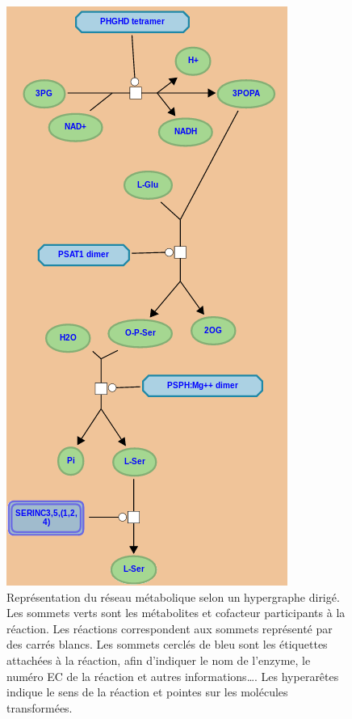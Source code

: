 \begin{refsegment}
\begin{shadedfigure}
\begin{subfigure}[t]{.45\textwidth}
        \includegraphics[width=\textwidth]{img/reactome_homo_sapiens_serine_biosynthesis.png}
        \caption{ Représentation du réseau métabolique selon un hypergraphe dirigé. Les sommets verts sont les métabolites et cofacteur participants à la réaction. Les réactions correspondent aux sommets représenté par des carrés blancs. Les sommets cerclés de bleu sont les étiquettes attachées à la réaction, afin d'indiquer le nom de l'enzyme, le numéro \gls{EC} de la réaction et autres informations\ldots. Les hyperarêtes indique le sens de la réaction et pointes sur les molécules transformées. }
        \label{fig:reactome_serine}
    \end{subfigure}
    \end{shadedfigure}


\end{refsegment}

